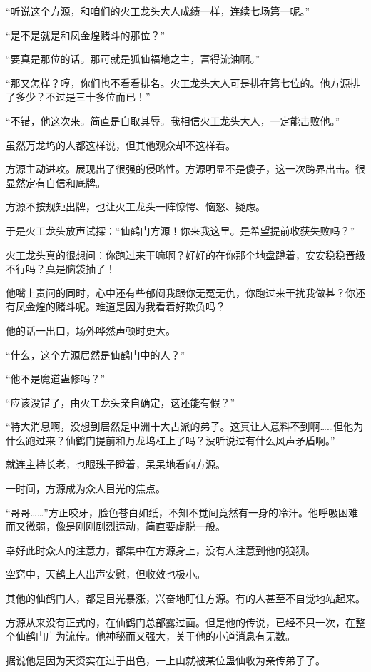 \begin{this_body}
“听说这个方源，和咱们的火工龙头大人成绩一样，连续七场第一呢。”

“是不是就是和凤金煌赌斗的那位？”

“要真是那位的话。那可就是狐仙福地之主，富得流油啊。”

“那又怎样？哼，你们也不看看排名。火工龙头大人可是排在第七位的。他方源排了多少？不过是三十多位而已！”

“不错，他这次来。简直是自取其辱。我相信火工龙头大人，一定能击败他。”

虽然万龙坞的人都这样说，但其他观众却不这样看。

方源主动进攻。展现出了很强的侵略性。方源明显不是傻子，这一次跨界出击。很显然定有自信和底牌。

方源不按规矩出牌，也让火工龙头一阵惊愕、恼怒、疑虑。

于是火工龙头放声试探：“仙鹤门方源！你来我这里。是希望提前收获失败吗？”

火工龙头真的很想问：你跑过来干嘛啊？好好的在你那个地盘蹲着，安安稳稳晋级不行吗？真是脑袋抽了！

他嘴上责问的同时，心中还有些郁闷我跟你无冤无仇，你跑过来干扰我做甚？你还有凤金煌的赌斗呢。难道是因为我看着好欺负吗？

他的话一出口，场外哗然声顿时更大。

“什么，这个方源居然是仙鹤门中的人？”

“他不是魔道蛊修吗？”

“应该没错了，由火工龙头亲自确定，这还能有假？”

“特大消息啊，没想到居然是中洲十大古派的弟子。这真让人意料不到啊……但他为什么跑过来？仙鹤门提前和万龙坞杠上了吗？没听说过有什么风声矛盾啊。”

就连主持长老，也眼珠子瞪着，呆呆地看向方源。

一时间，方源成为众人目光的焦点。

“哥哥……”方正咬牙，脸色苍白如纸，不知不觉间竟然有一身的冷汗。他呼吸困难而又微弱，像是刚刚剧烈运动，简直要虚脱一般。

幸好此时众人的注意力，都集中在方源身上，没有人注意到他的狼狈。

空窍中，天鹤上人出声安慰，但收效也极小。

其他的仙鹤门人，都是目光暴涨，兴奋地盯住方源。有的人甚至不自觉地站起来。

方源从来没有正式的，在仙鹤门总部露过面。但是他的传说，已经不只一次，在整个仙鹤门广为流传。他神秘而又强大，关于他的小道消息有无数。

据说他是因为天资实在过于出色，一上山就被某位蛊仙收为亲传弟子了。


\end{this_body}
